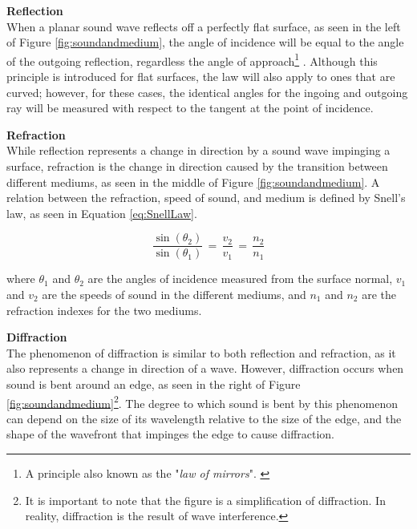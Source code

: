 \textbf{Reflection}\\
When a planar sound wave reflects off a perfectly flat surface, as seen in the left of Figure \ref{fig:soundandmedium}, the angle of incidence will be equal to the angle of the outgoing reflection, regardless the angle of approach\footnote{A principle also known as the "\textit{law of mirrors}". \cite{Acoustics:Handbook_of_Acoustics}} \cite{Acoustics:Definition_of_sound3,Acoustics:Handbook_of_Acoustics}. Although this principle is introduced for flat surfaces, the law will also apply to ones that are curved; however, for these cases, the identical angles for the ingoing and outgoing ray will be measured with respect to the tangent at the point of incidence. 

\textbf{Refraction}\\
While reflection represents a change in direction by a sound wave impinging a surface, refraction is the change in direction caused by the transition between different mediums, as seen in the middle of Figure \ref{fig:soundandmedium}. A relation between the refraction, speed of sound, and medium is defined by Snell's law, as seen in Equation \ref{eq:SnellLaw}. \cite{Acoustics:Definition_of_sound3,Acoustics:Handbook_of_Acoustics} 

\begin{equation}\label{eq:SnellLaw}
    \frac{\sin{(\theta_2)}}{\sin{(\theta_1)}}\,=\,\frac{v_2}{v_1}\,=\,\frac{n_2}{n_1} 
\end{equation}

where $\theta_1$ and $\theta_2$ are the angles of incidence measured from the surface normal, $v_1$ and $v_2$ are the speeds of sound in the different mediums, and $n_1$ and $n_2$ are the refraction indexes for the two mediums. 

\textbf{Diffraction}\\
The phenomenon of diffraction is similar to both reflection and refraction, as it also represents a change in direction of a wave. However, diffraction occurs when sound is bent around an edge, as seen in the right of Figure \ref{fig:soundandmedium}\footnote{It is important to note that the figure is a simplification of diffraction. In reality, diffraction is the result of wave interference.\cite{Acoustics:Handbook_of_Acoustics}}. The degree to which sound is bent by this phenomenon can depend on the size of its wavelength relative to the size of the edge, and the shape of the wavefront that impinges the edge to cause diffraction. \cite{Acoustics:Handbook_of_Acoustics}

